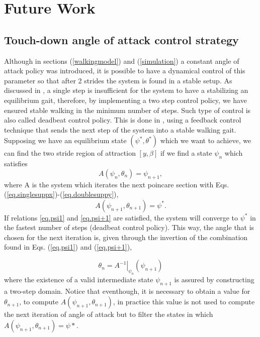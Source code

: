 \section{Future Work}
\subsection{Touch-down angle of attack control strategy}\label{TDcontrol}
Although in sections (\ref{walkingmodel}) and (\ref{simulation}) a constant angle of attack policy was introduced, it is possible to have a dynamical control of this parameter so that after 2 strides the system is found in a stable setup.  As discussed in \cite{Carver2009}, a single step is insufficient for the system to have a stabilizing an equilibrium gait, therefore, by implementing a two step control policy, we have ensured stable walking in the minimum number of steps. Such type of control is also called deadbeat control policy. This is done in \cite{Vejdani2015}, using a feedback control technique that sends the next step of the system into a stable walking gait. Supposing we have an equilibrium state $(\psi^*,\theta^*)$ which we want to achieve, we can find the two stride region of attraction $[y,\beta]$ if we find a state $\psi_n$ which satisfies
\begin{equation}
  A(\psi_n,\theta_n)=\psi_{n+1},
  \label{eq.psi1}
  \end{equation}
\noindent where A is the system which iterates the next poincare section with Eqs. (\ref{eq.singlesuppx})-(\ref{eq.doublesuppy}),
\begin{equation}
  A(\psi_{n+1},\theta_{n+1})=\psi^*.
  \label{eq.psi+1}
\end{equation}
\noindent If relations \ref{eq.psi1} and \ref{eq.psi+1} are satisfied, the system will converge to $\psi^*$ in the fastest number of steps (deadbeat control policy). This way, the angle that is chosen for the next iteration is, given through the invertion of the combination found in Eqs. (\ref{eq.psi1}) and (\ref{eq.psi+1}), 

\begin{equation}
  \theta_n=\left.A^{-1}\right|_{\psi_n}(\psi_{n+1})
\end{equation}
where the existence of a valid intermediate state $\psi_{n+1}$ is assured by constructing a two-step domain. Notice that eventhough, it is necessary to obtain a value for $\theta_{n+1}$, to compute $A(\psi_{n+1},\theta_{n+1})$, in practice this value is not used to compute the next iteration of angle of attack but to filter the states in which $A(\psi_{n+1},\theta_{n+1})=\psi*$.




